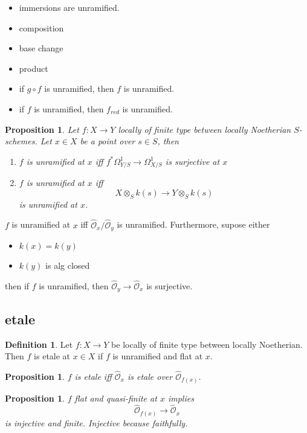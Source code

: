 \documentclass[leqno]{amsart}
\newcommand{\oo}{\mathcal O}
\newcommand{\1}{\mathbf{1}}
\newtheorem{prop}[thm]{Proposition}
\theoremstyle{definition}
\newtheorem{defn}[thm]{Definition}
\theoremstyle{remark}
\begin{document}
\begin{itemize}
	\item immersions are unramified.
	\item composition
	\item base change
	\item product 
	\item if $g\circ f$ is unramified, then
		 $f$ is unramified.
	\item if  $f$ is unramified, 
		 then  $f_{red}$ is unramified.
\end{itemize}

\begin{prop}
	Let $f\colon X\to Y$ locally of finite type
	between locally Noetherian  $S$-schemes.
	Let  $x\in X$ be a point over  $s\in S$, then
	 \begin{enumerate}[label=(\alph*)]
		\item $f$ is unramified at $x$ iff
			$f^*\Omega^1_{Y/S}\to \Omega^1_{X/S}$
			is surjective at $x$
		\item  $f$ is unramified at $x$ iff
			\[
				X\otimes_Sk(s)\to 
				Y\otimes_Sk(s)
			\]
			is unramified at $x$.
	\end{enumerate}
\end{prop}

$f$ is unramified at $x$ iff
 $ \hat{\oo}_x/\hat{\oo}_y$ is unramified.
 Furthermore, supose either
 \begin{itemize}
	 \item $k(x)=k(y)$
	 \item  $k(y)$ is alg closed
 \end{itemize}
 then if $f$ is unramified,
 then  $ \hat{\oo}_y\to \hat{\oo}_x$ is surjective.

\subsection{etale}

\begin{defn}
	Let $f\colon X\to Y$
	be locally of finite type
	between locally Noetherian.
	Then  $f$ is etale at  $x\in X$
	if  $f$ is unramified and flat
	at  $x$.
\end{defn}

\begin{prop}
	$f$ is etale iff
	 $ \hat{\oo}_x$ is
	 etale over $ \hat{\oo}_{f(x)}$.
\end{prop}

\begin{prop}
	$f$ flat and quasi-finite at  $x$
	implies
	 \[
		 \hat{\oo}_{f(x)}\to \hat{\oo}_x
	\]
	is injective and finite.
	Injective because faithfully.
\end{prop}
\end{document}
